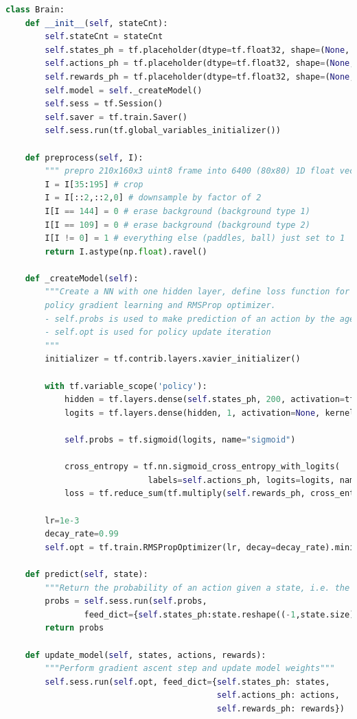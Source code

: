 \documentclass[a4paper, 11pt]{article}
\begin{document}
\begin{lstlisting}[language=Python, caption=Policy Gradient Brain definition, label={lst:PG-brain}]
class Brain:
    def __init__(self, stateCnt):
        self.stateCnt = stateCnt     
        self.states_ph = tf.placeholder(dtype=tf.float32, shape=(None, self.stateCnt))    
        self.actions_ph = tf.placeholder(dtype=tf.float32, shape=(None,1))
        self.rewards_ph = tf.placeholder(dtype=tf.float32, shape=(None,1))
        self.model = self._createModel()      
        self.sess = tf.Session()
        self.saver = tf.train.Saver()
        self.sess.run(tf.global_variables_initializer())
   
    def preprocess(self, I):
        """ prepro 210x160x3 uint8 frame into 6400 (80x80) 1D float vector """
        I = I[35:195] # crop
        I = I[::2,::2,0] # downsample by factor of 2
        I[I == 144] = 0 # erase background (background type 1)
        I[I == 109] = 0 # erase background (background type 2)
        I[I != 0] = 1 # everything else (paddles, ball) just set to 1
        return I.astype(np.float).ravel()
    
    def _createModel(self):
        """Create a NN with one hidden layer, define loss function for 
        policy gradient learning and RMSProp optimizer.
        - self.probs is used to make prediction of an action by the agent
        - self.opt is used for policy update iteration       
        """
        initializer = tf.contrib.layers.xavier_initializer()
        
        with tf.variable_scope('policy'):
            hidden = tf.layers.dense(self.states_ph, 200, activation=tf.nn.relu, kernel_initializer = initializer)
            logits = tf.layers.dense(hidden, 1, activation=None, kernel_initializer = initializer)
        
            self.probs = tf.sigmoid(logits, name="sigmoid")
        
            cross_entropy = tf.nn.sigmoid_cross_entropy_with_logits(
                             labels=self.actions_ph, logits=logits, name="cross_entropy")
            loss = tf.reduce_sum(tf.multiply(self.rewards_ph, cross_entropy, name="rewards"))
        
        lr=1e-3
        decay_rate=0.99
        self.opt = tf.train.RMSPropOptimizer(lr, decay=decay_rate).minimize(loss)
    
    def predict(self, state):
        """Return the probability of an action given a state, i.e. the policy """
        probs = self.sess.run(self.probs, 
                feed_dict={self.states_ph:state.reshape((-1,state.size))})
        return probs
    
    def update_model(self, states, actions, rewards):
        """Perform gradient ascent step and update model weights"""
        self.sess.run(self.opt, feed_dict={self.states_ph: states,
                                           self.actions_ph: actions, 
                                           self.rewards_ph: rewards})
\end{lstlisting}
\end{document}
